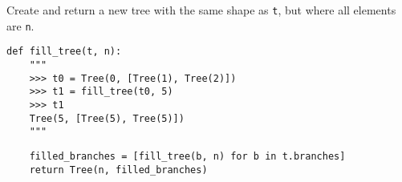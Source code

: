 \question Create and return a new tree with the same shape as \texttt{t}, 
but where all elements are \texttt{n}.
\begin{lstlisting}
def fill_tree(t, n):
    """
    >>> t0 = Tree(0, [Tree(1), Tree(2)])
    >>> t1 = fill_tree(t0, 5)
    >>> t1
    Tree(5, [Tree(5), Tree(5)])
    """  
\end{lstlisting}
\begin{solution}[1in]
\begin{lstlisting}
    filled_branches = [fill_tree(b, n) for b in t.branches]
    return Tree(n, filled_branches)
\end{lstlisting}
\end{solution}
